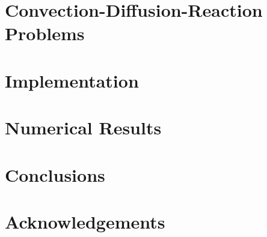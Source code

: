 \documentclass[12pt, oneside]{book}
\begin{document}
    \newpage
    \chapter{Convection-Diffusion-Reaction Problems} \label{chapter:cdr}

    


    \newpage
    \chapter{Implementation} \label{chapter:implementation}

    


    \newpage
    \chapter{Numerical Results}

    


    \newpage
    \chapter*{Conclusions}
     \label{chapter:conclusions}

    


    \chapter*{Acknowledgements}

    


    \newpage

    \printbibliography


    \newpage
    
    
\end{document}
